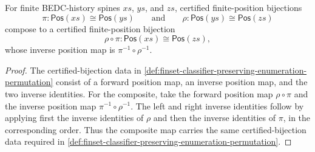 \begin{lemma}
\label{lem:finset-enum-position-bijection-composition}
For finite BEDC-history spines $xs$, $ys$, and $zs$, certified finite-position bijections
$$
\pi:\mathsf{Pos}(xs)\cong\mathsf{Pos}(ys)
\qquad\text{and}\qquad
\rho:\mathsf{Pos}(ys)\cong\mathsf{Pos}(zs)
$$
compose to a certified finite-position bijection
$$
\rho\circ\pi:\mathsf{Pos}(xs)\cong\mathsf{Pos}(zs),
$$
whose inverse position map is $\pi^{-1}\circ\rho^{-1}$.
\end{lemma}
\begin{proof}
The certified-bijection data in \autoref{def:finset-classifier-preserving-enumeration-permutation} consist of a forward position map, an inverse position map, and the two inverse identities. For the composite, take the forward position map $\rho\circ\pi$ and the inverse position map $\pi^{-1}\circ\rho^{-1}$. The left and right inverse identities follow by applying first the inverse identities of $\rho$ and then the inverse identities of $\pi$, in the corresponding order. Thus the composite map carries the same certified-bijection data required in \autoref{def:finset-classifier-preserving-enumeration-permutation}.
\end{proof}


